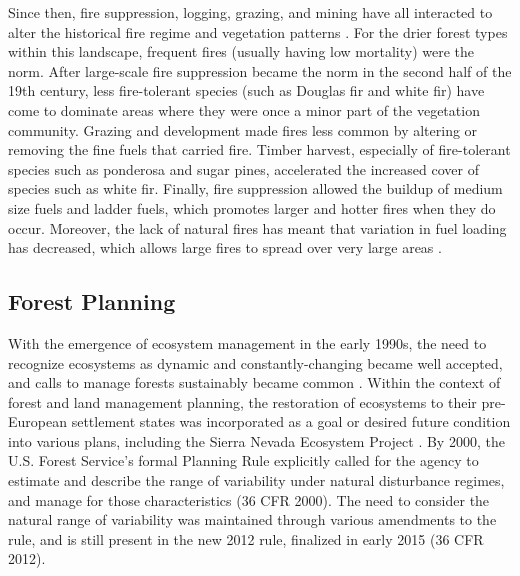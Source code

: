 \documentclass[12pt]{article}
\begin{document}
\begin{spacing}{1}
Since then, fire suppression, logging, grazing, and mining have all interacted to alter the historical fire regime and vegetation patterns \citep{Stephens2015,Knapp2013}. For the drier forest types within this landscape, frequent fires (usually having low mortality) were the norm. After large-scale fire suppression became the norm in the second half of the 19th century, less fire-tolerant species (such as Douglas fir and white fir) have come to dominate areas where they were once a minor part of the vegetation community. Grazing and development made fires less common by altering or removing the fine fuels that carried fire. Timber harvest, especially of fire-tolerant species such as ponderosa and sugar pines, accelerated the increased cover of species such as white fir. Finally, fire suppression allowed the buildup of medium size fuels and ladder fuels, which promotes larger and hotter fires when they do occur. Moreover, the lack of natural fires has meant that variation in fuel loading has decreased, which allows large fires to spread over very large areas \citep{Hessburg2005}.


\subsection{Forest Planning}
With the emergence of ecosystem management in the early 1990s, the need to recognize ecosystems as dynamic and constantly-changing became well accepted, and calls to manage forests sustainably became common \citep{Christensen1996}. Within the context of forest and land management planning, the restoration of ecosystems to their pre-European settlement states was incorporated as a goal or desired future condition into various plans, including the Sierra Nevada Ecosystem Project \cite{SNEP1996a}. By 2000, the U.S. Forest Service's formal Planning Rule explicitly called for the agency to estimate and describe the range of variability under natural disturbance regimes, and manage for those characteristics (36 CFR  2000). The need to consider the natural range of variability was maintained through various amendments to the rule, and is still present in the new 2012 rule, finalized in early 2015 (36 CFR  2012).



\end{spacing}
\end{document}
